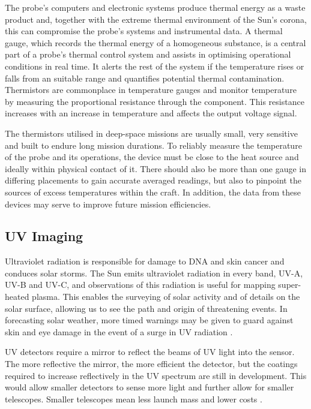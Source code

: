 \documentclass[12pt]{article}
\begin{document}
The probe’s computers and electronic systems produce thermal energy as a waste product and, together with the extreme thermal environment of the Sun’s corona, this can compromise the probe’s systems and instrumental data. A thermal gauge, which records the thermal energy of a homogeneous substance, is a central part of a probe’s thermal control system and assists in optimising operational conditions in real time. It alerts the rest of the system if the temperature rises or falls from an suitable range and quantifies potential thermal contamination. Thermistors are commonplace in temperature gauges and monitor temperature by measuring the proportional resistance through the component. This resistance increases with an increase in temperature and affects the output voltage signal.
\vspace{\baselineskip}

The thermistors utilised in deep-space missions are usually small, very sensitive and built to endure long mission durations. To reliably measure the temperature of the probe and its operations, the device must be close to the heat source and ideally within physical contact of it. There should also be more than one gauge in differing placements to gain accurate averaged readings, but also to pinpoint the sources of excess temperatures within the craft. In addition, the data from these devices may serve to improve future mission efficiencies.

\vspace{\baselineskip}
\subsection{UV Imaging}
\vspace{\baselineskip}

Ultraviolet radiation is responsible for damage to DNA and skin cancer and conduces solar storms. The Sun emits ultraviolet radiation in every band, UV-A, UV-B and UV-C, and observations of this radiation is useful for mapping super-heated plasma. This enables the surveying of solar activity and of details on the solar surface, allowing us to see the path and origin of threatening events. In forecasting solar weather, more timed warnings may be given to guard against skin and eye damage in the event of a surge in UV radiation \cite{uv}.

\vspace{\baselineskip}

UV detectors require a mirror to reflect the beams of UV light into the sensor. The more reflective the mirror, the more efficient the detector, but the coatings required to increase reflectively in the UV spectrum are still in development. This would allow smaller detectors to sense more light and further allow for smaller telescopes. Smaller telescopes mean less launch mass and lower costs \cite{uv2}.
\end{document}
